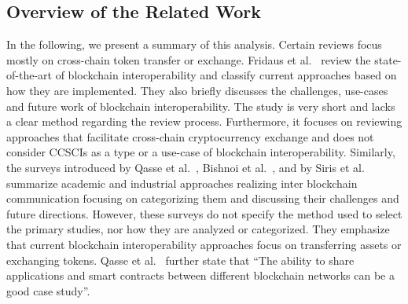 \documentclass[review]{elsarticle}
\begin{document}
\subsection{Overview of the Related Work}
In the following, we present a summary of this analysis.
Certain reviews focus mostly on cross-chain token transfer or exchange.
Fridaus et al.~\cite{Fridaus2020InteroperabilityReview} review the state-of-the-art of blockchain interoperability and classify current approaches based on how they are implemented.
They also briefly discusses the challenges, use-cases and future work of blockchain interoperability.
The study is very short and lacks a clear method regarding the review process.
Furthermore, it focuses on reviewing approaches that facilitate cross-chain cryptocurrency exchange and does not consider CCSCIs as a type or a use-case of blockchain interoperability.
Similarly, the surveys introduced by Qasse et al.~\cite{Qasse2019}, Bishnoi et al.~\cite{Bishnoi2020Interoperability}, and by Siris et al.~\cite{Siris2019} summarize academic and industrial approaches realizing inter blockchain communication focusing on categorizing them and discussing their challenges and future directions.
However, these surveys do not specify the method used to select the primary studies, nor how they are analyzed or categorized.
They emphasize that current blockchain interoperability approaches focus on transferring assets or exchanging tokens.
Qasse et al.~\cite{Qasse2019} further state that \enquote{The ability to share applications and smart contracts between different blockchain networks can be a good case study}.
\end{document}
